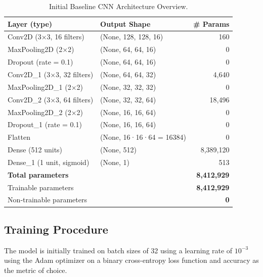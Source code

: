 \documentclass[conference]{IEEEtran}
\begin{document}
\begin{table}[htbp]
	\caption{Initial Baseline CNN Architecture Overview.}
	\label{table:baseline_cnn_overview}
	\centering
	\begin{adjustbox}{width=0.48\textwidth}
		\begin{tabular}{|l|l|r|}
			\hline
			\textbf{Layer (type)} & \textbf{Output Shape} & \textbf{\# Params} \\
			\hline
			Conv2D (3×3, 16 filters)       & (None, 128, 128, 16)   &    160  \\
			MaxPooling2D (2×2)             & (None, 64, 64, 16)     &      0  \\
			Dropout (rate = 0.1)           & (None, 64, 64, 16)     &      0  \\
			Conv2D\_1 (3×3, 32 filters)    & (None, 64, 64, 32)     &  4,640  \\
			MaxPooling2D\_1 (2×2)          & (None, 32, 32, 32)     &      0  \\
			Conv2D\_2 (3×3, 64 filters)    & (None, 32, 32, 64)     & 18,496  \\
			MaxPooling2D\_2 (2×2)          & (None, 16, 16, 64)     &      0  \\
			Dropout\_1 (rate = 0.1)        & (None, 16, 16, 64)     &      0  \\
			Flatten                        & (None, 16·16·64 = 16384)&      0  \\
			Dense (512 units)              & (None, 512)            & 8,389,120\\
			Dense\_1 (1 unit, sigmoid)     & (None, 1)              &     513 \\
			\hline
			\multicolumn{2}{|l|}{\textbf{Total parameters}} & \textbf{8,412,929} \\
			\multicolumn{2}{|l|}{Trainable parameters}       & \textbf{8,412,929} \\
			\multicolumn{2}{|l|}{Non‑trainable parameters}   & \textbf{0}        \\
			\hline
		\end{tabular}
	\end{adjustbox}
\end{table}

\subsection{Training Procedure}
The model is initially trained on batch sizes of 32 using a learning rate of $10^{-3}$ using the Adam optimizer on a binary cross-entropy loss function and accuracy as the metric of choice.
\end{document}
